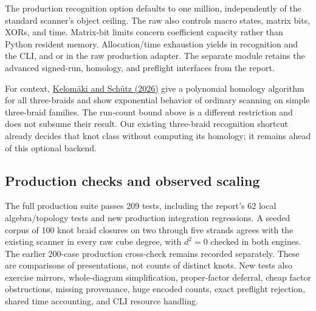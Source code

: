 The production recognition option  defaults
to one million, independently of the standard scanner's object ceiling.
The raw  also controls macro states, matrix bits, XORs,
and time. Matrix-bit limits concern coefficient capacity rather than
Python resident memory. Allocation/time exhaustion yields
 in recognition and the CLI, and  or
 in the raw production adapter. The separate
 module retains the advanced signed-run,
homology, and preflight interfaces from the report.

For context, \href{https://arxiv.org/abs/2601.02119}{Kelom\"aki and
Sch\"utz (2026)} give a polynomial homology algorithm for all
three-braids and show exponential behavior of ordinary scanning on
simple three-braid families. The run-count bound above is a different
restriction and does not subsume their result. Our existing three-braid
recognition shortcut already decides that knot class without computing
its homology; it remains ahead of this optional backend.

\subsection{Production checks and observed scaling}
The full production suite passes 209 tests, including the report's 62
local algebra/topology tests and new production integration regressions.
A seeded corpus of 100 knot braid closures on two through five strands
agrees with the existing scanner in every raw cube degree, with
$d^2=0$ checked in both engines. The earlier 200-case production
cross-check remains recorded separately. These are comparisons of
presentations, not counts of distinct knots. New tests also exercise
mirrors, whole-diagram simplification, proper-factor deferral, cheap
factor obstructions, missing provenance, huge encoded counts, exact
preflight rejection, shared time accounting, and CLI resource handling.

